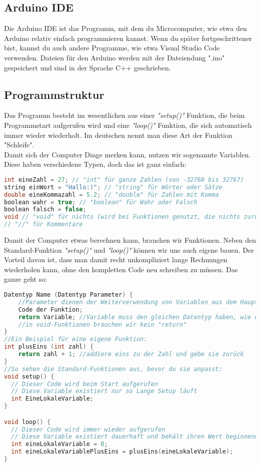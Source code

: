 \subsection{\large{Arduino IDE}}
Die Arduino IDE ist das Programm, mit dem du Microcomputer, wie etwa den Arduino relativ einfach programmieren kannst. Wenn du später fortgeschrittener bist, kannst du auch andere Programme, wie etwa Visual Studio Code verwenden. Dateien für den Arduino werden mit der Dateiendung ".ino" gespeichert und sind in der Sprache C++ geschrieben.\\
\subsection{\large{Programmstruktur}}
Das Programm besteht im wesentlichen aus einer \textit{"setup()"} Funktion, die beim Programmstart aufgerufen wird und eine \textit{"loop()"} Funktion, die sich automatisch immer wieder wiederholt. Im deutschen nennt man diese Art der Funktion "Schleife".\\
Damit sich der Computer Dinge merken kann, nutzen wir sogenannte Variablen.
Diese haben verschiedene Typen, doch das ist ganz einfach:
\begin{lstlisting}[language=c, caption=Datentypen in C]
int eineZahl = 27; // "int" für ganze Zahlen (von -32768 bis 32767)
string einWort = "Hallo:)"; // "string" für Wörter oder Sätze
double eineKommazahl = 5.2; // "double" für Zahlen mit Komma
boolean wahr = true; // "boolean" für Wahr oder Falsch
boolean falsch = false;
void // "void" für nichts (wird bei Funktionen genutzt, die nichts zurückgeben sollen)
// "//" für Kommentare

\end{lstlisting}
\hfill \break \hfill \break \hfill \break
Damit der Computer etwas berechnen kann, brauchen wir Funktionen. Neben den Standard-Funktion  \textit{"setup()"} und \textit{"loop()"} können wir uns auch eigene bauen. Der Vorteil davon ist, dass man damit recht unkompliziert lange Rechnungen wiederholen kann, ohne den kompletten Code neu schreiben zu müssen.
Das ganze geht so:

\begin{lstlisting}[language=c, caption=Funktionen in C]
Datentyp Name (Datentyp Parameter) {
	//Parameter dienen der Weiterverwendung von Variablen aus dem Hauptprogramm
	Code der Funktion; 
	return Variable; //Variable muss den gleichen Datentyp haben, wie der zuvor vor dem Funktionsnamen definierte Datentyp
	//in void-Funktionen brauchen wir kein "return"
}
//Ein Beispiel für eine eigene Funktion:
int plusEins (int zahl) {
	return zahl + 1; //addiere eins zu der Zahl und gebe sie zurück
}
//So sehen die Standard-Funktionen aus, bevor du sie anpasst:
void setup() {
  // Dieser Code wird beim Start aufgerufen
  // Diese Variable existiert nur so Lange Setup läuft
  int EineLokaleVariable;  
}

void loop() {
  // Dieser Code wird immer wieder aufgerufen
  // Diese Variable existiert dauerhaft und behält ihren Wert beginnend mit 0
  int eineLokaleVariable = 0; 
  int eineLokaleVariablePlusEins = plusEins(eineLokaleVariable);
}
\end{lstlisting}
